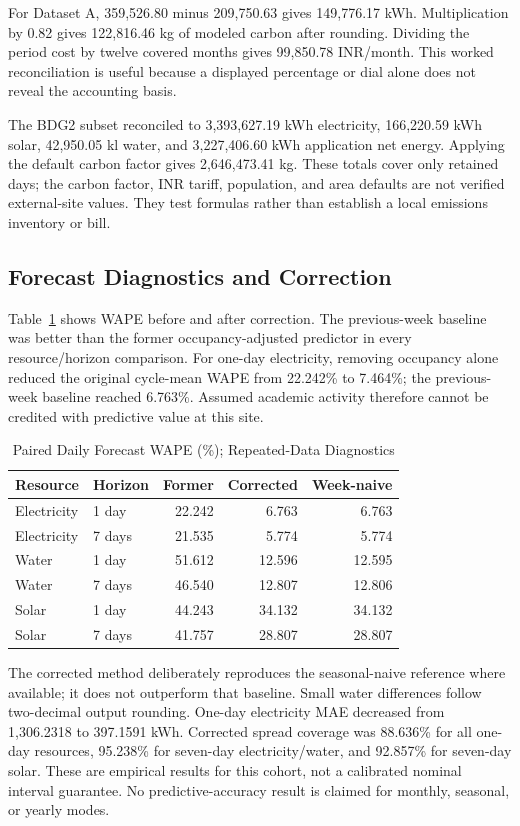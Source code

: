 \documentclass[conference]{IEEEtran}
\begin{document}
For Dataset A, 359,526.80 minus 209,750.63 gives 149,776.17 kWh. Multiplication by 0.82 gives 122,816.46 kg of modeled carbon after rounding. Dividing the period cost by twelve covered months gives 99,850.78 INR/month. This worked reconciliation is useful because a displayed percentage or dial alone does not reveal the accounting basis.

The BDG2 subset reconciled to 3,393,627.19 kWh electricity, 166,220.59 kWh solar, 42,950.05 kl water, and 3,227,406.60 kWh application net energy. Applying the default carbon factor gives 2,646,473.41 kg. These totals cover only retained days; the carbon factor, INR tariff, population, and area defaults are not verified external-site values. They test formulas rather than establish a local emissions inventory or bill.

\subsection{Forecast Diagnostics and Correction}
Table~\ref{tab:forecast} shows WAPE before and after correction. The previous-week baseline was better than the former occupancy-adjusted predictor in every resource/horizon comparison. For one-day electricity, removing occupancy alone reduced the original cycle-mean WAPE from 22.242\% to 7.464\%; the previous-week baseline reached 6.763\%. Assumed academic activity therefore cannot be credited with predictive value at this site.

\begin{table}[t]
\caption{Paired Daily Forecast WAPE (\%); Repeated-Data Diagnostics}
\label{tab:forecast}
\centering\footnotesize
\begin{tabular}{llrrr}
\toprule
Resource & Horizon & Former & Corrected & Week-naive\\
\midrule
Electricity & 1 day & 22.242 & 6.763 & 6.763\\
Electricity & 7 days & 21.535 & 5.774 & 5.774\\
Water & 1 day & 51.612 & 12.596 & 12.595\\
Water & 7 days & 46.540 & 12.807 & 12.806\\
Solar & 1 day & 44.243 & 34.132 & 34.132\\
Solar & 7 days & 41.757 & 28.807 & 28.807\\
\bottomrule
\end{tabular}
\end{table}

The corrected method deliberately reproduces the seasonal-naive reference where available; it does not outperform that baseline. Small water differences follow two-decimal output rounding. One-day electricity MAE decreased from 1,306.2318 to 397.1591 kWh. Corrected spread coverage was 88.636\% for all one-day resources, 95.238\% for seven-day electricity/water, and 92.857\% for seven-day solar. These are empirical results for this cohort, not a calibrated nominal interval guarantee. No predictive-accuracy result is claimed for monthly, seasonal, or yearly modes.
\end{document}
